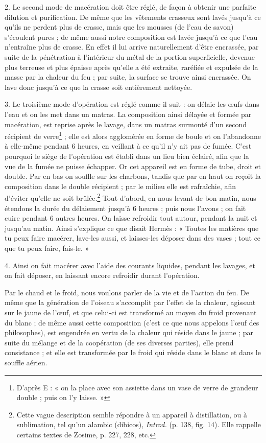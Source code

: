\documentclass[a4paper, 11pt, oneside, polutonikogreek, french]{article}
\begin{document}
2. Le second mode de macération doit être réglé, de façon à obtenir une parfaite dilution et purification. De même que les vêtements crasseux sont lavés jusqu'à ce qu'ils ne perdent plus de crasse, mais que les mousses (de l'eau de savon) s'écoulent pures ; de même aussi notre composition est lavée jusqu'à ce que l'eau n'entraîne plus de crasse. En effet il lui arrive naturellement d'être encrassée, par suite de la pénétration à l'intérieur du métal de la portion superficielle, devenue plus terreuse et plus épaisse après qu'elle a été extraite, raréfiée et expulsée de la masse par la chaleur du feu ; par suite, la surface se trouve ainsi encrassée. On lave donc jusqu'à ce que la crasse soit entièrement nettoyée.

3. Le troisième mode d'opération est réglé comme il suit : on délaie les œufs dans l'eau et on les met dans un matras. La composition ainsi délayée et formée par macération, est reprise après le lavage, dans un matras surmonté d'un second récipient de verre\footnote{D'après E : « on la place avec son assiette dans un vase de verre de grandeur double ; puis on l'y laisse. »} ; elle est alors agglomérée en forme de boule et on l'abandonne à elle-même pendant 6 heures, en veillant à ce qu'il n'y ait pas de fumée. C'est pourquoi le siège de l'opération est établi dans un lieu bien éclairé, afin que la vue de la fumée ne puisse échapper. Or cet appareil est en forme de tube, droit et double. Par en bas on souffle sur les charbons, tandis que par en haut on reçoit la composition dans le double récipient ; par le milieu elle est rafraîchie, afin d'éviter qu'elle ne soit brûlée.\footnote{Cette vague description semble répondre à un appareil à distillation, ou à sublimation, tel qu'un alambic (dibicos), \emph{Introd.} (p. 138, fig. 14). Elle rappelle certains textes de Zosime, p. 227, 228, etc.} Tout d'abord, en nous levant de bon matin, nous étendons la durée du délaiement jusqu'à 6 heures ; puis nous l'avons ; on fait cuire pendant 6 autres heures. On laisse refroidir tout autour, pendant la nuit et jusqu'au matin. Ainsi s'explique ce que disait Hermès : « Toutes les matières que tu peux faire macérer, lave-les aussi, et laisses-les déposer dans des vases ; tout ce que tu peux faire, fais-le. »

4. Ainsi on fait macérer avec l'aide des courants liquides, pendant les lavages, et on fait déposer, en laissant encore refroidir durant l'opération.

Par le chaud et le froid, nous voulons parler de la vie et de l'action du feu. De même que la génération de l'oiseau s'accomplit par l'effet de la chaleur, agissant sur le jaune de l'œuf, et que celui-ci est transformé au moyen du froid provenant du blanc ; de même aussi cette composition (c'est ce que nous appelons l'œuf des philosophes), est engendrée en vertu de la chaleur qui réside dans le jaune ; par suite du mélange et de la coopération (de ses diverses parties), elle prend consistance ; et elle est transformée par le froid qui réside dans le blanc et dans le souffle aérien.
\end{document}
